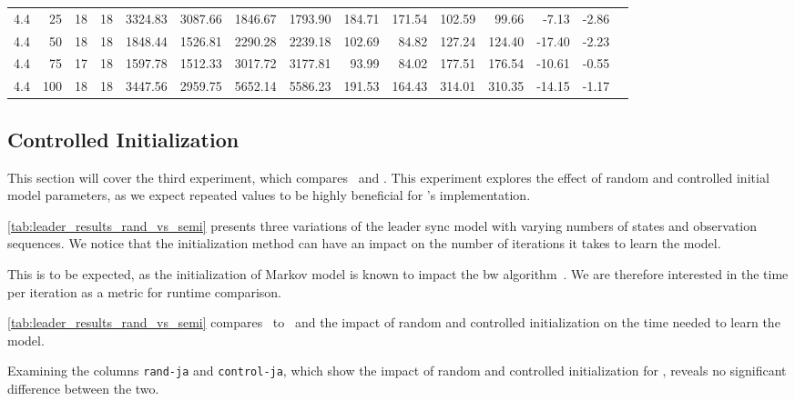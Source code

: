 \begin{table*}
\begin{tabular}{rrrrrrrrrrrrrrr}
        4.4           & 25  & 18      & 18      & 3324.83     & 3087.66     & 1846.67    & 1793.90    & 184.71        & 171.54        & 102.59       & 99.66        & -7.13        & -2.86       \\
        4.4           & 50  & 18      & 18      & 1848.44     & 1526.81     & 2290.28    & 2239.18    & 102.69        & 84.82         & 127.24       & 124.40       & -17.40       & -2.23       \\
        4.4           & 75  & 17      & 18      & 1597.78     & 1512.33     & 3017.72    & 3177.81    & 93.99         & 84.02         & 177.51       & 176.54       & -10.61       & -0.55       \\
        4.4           & 100 & 18      & 18      & 3447.56     & 2959.75     & 5652.14    & 5586.23    & 191.53        & 164.43        & 314.01       & 310.35       & -14.15       & -1.17       \\
        \bottomrule
    \end{tabular}
\end{table*}


\subsection{Controlled Initialization}\label{subsec:controled_initialization}
This section will cover the third experiment, which compares \Cupaal\ and \Jajapy.
This experiment explores the effect of random and controlled initial model parameters, as we expect repeated values to be highly beneficial for \Cupaal’s implementation.

\autoref{tab:leader_results_rand_vs_semi} presents three variations of the leader sync model with varying numbers of states and observation sequences.
We notice that the initialization method can have an impact on the number of iterations it takes to learn the model.

This is to be expected, as the initialization of Markov model is known to impact the \gls{bw} algorithm~\cite{Rabiner89}.
We are therefore interested in the time per iteration as a metric for runtime comparison.

\autoref{tab:leader_results_rand_vs_semi} compares \Cupaal\ to \Jajapy\ and the impact of random and controlled initialization on the time needed to learn the model.

Examining the columns \texttt{rand-ja} and \texttt{control-ja}, which show the impact of random and controlled initialization for \Jajapy, reveals no significant difference between the two.

